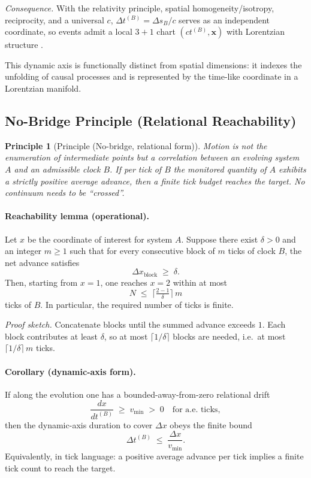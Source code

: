 \documentclass[12pt]{article}
\newtheorem*{principle}{Principle}
\begin{document}
\medskip
\noindent\emph{Consequence.}
With the relativity principle, spatial homogeneity/isotropy, reciprocity, and a universal \(c\), \(\Delta t^{(B)}=\Delta s_B/c\) serves as an independent coordinate, so events admit a local \(3{+}1\) chart \((ct^{(B)},\mathbf{x})\) with Lorentzian structure \cite{Minkowski1908,Rindler2006}.

\medskip
\noindent This dynamic axis is functionally distinct from spatial dimensions: it indexes the unfolding of causal processes and is represented by the time-like coordinate in a Lorentzian manifold.

\subsection*{No-Bridge Principle (Relational Reachability)}
\label{sec:no-bridge}

\begin{principle}[Principle (No-bridge, relational form)]
    Motion is not the enumeration of intermediate points but a \emph{correlation} between an
    evolving system \(A\) and an \emph{admissible} clock \(B\). If per tick of \(B\) the monitored
    quantity of \(A\) exhibits a strictly positive average advance, then a \emph{finite} tick
    budget reaches the target. No continuum needs to be ``crossed''.
\end{principle}

\paragraph{Reachability lemma (operational).}
Let \(x\) be the coordinate of interest for system \(A\). Suppose there exist \(\delta>0\) and
an integer \(m\ge 1\) such that for every consecutive block of \(m\) ticks of clock \(B\),
the net advance satisfies
\[
\Delta x_{\text{block}} \;\ge\; \delta.
\]
Then, starting from \(x=1\), one reaches \(x=2\) within at most
\[
N \;\le\; \Big\lceil \tfrac{2-1}{\delta} \Big\rceil\, m
\]
ticks of \(B\). In particular, the required number of ticks is finite.

\noindent\emph{Proof sketch.}
Concatenate blocks until the summed advance exceeds \(1\). Each block contributes at least
\(\delta\), so at most \(\lceil 1/\delta\rceil\) blocks are needed, i.e.\ at most
\(\lceil 1/\delta\rceil\,m\) ticks.

\paragraph{Corollary (dynamic-axis form).}
If along the evolution one has a bounded-away-from-zero relational drift
\[
\frac{dx}{dt^{(B)}} \;\ge\; v_{\min} \;>\; 0 \quad \text{for a.e.\ ticks},
\]
then the dynamic-axis duration to cover \(\Delta x\) obeys the finite bound
\[
\Delta t^{(B)} \;\le\; \frac{\Delta x}{v_{\min}}.
\]
Equivalently, in tick language: a positive average advance per tick implies a finite tick
count to reach the target.
\end{document}
